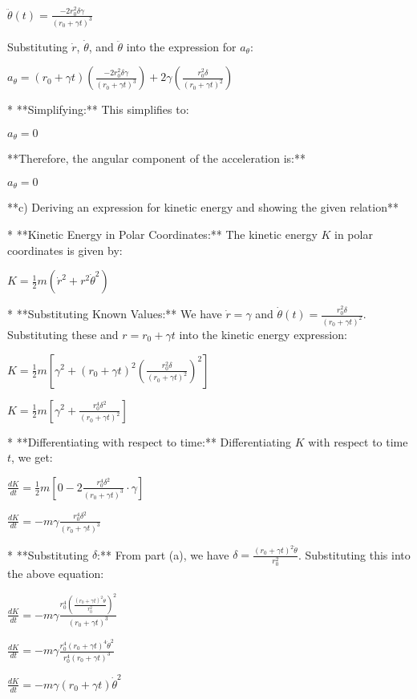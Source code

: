 \documentclass{article}
\begin{document}
   $\ddot{\theta}(t) = \frac{-2r_0^2 \delta \gamma}{(r_0 + \gamma t)^3}$

   Substituting $\dot{r}$, $\dot{\theta}$, and $\ddot{\theta}$ into the expression for $a_\theta$:

   $a_\theta = (r_0 + \gamma t) \left( \frac{-2r_0^2 \delta \gamma}{(r_0 + \gamma t)^3} \right) + 2 \gamma \left( \frac{r_0^2 \delta}{(r_0 + \gamma t)^2} \right)$

* **Simplifying:** This simplifies to:

   $a_\theta = 0$

**Therefore, the angular component of the acceleration is:**

$\boxed{a_\theta = 0}$


**c) Deriving an expression for kinetic energy and showing the given relation**

* **Kinetic Energy in Polar Coordinates:** The kinetic energy $K$ in polar coordinates is given by:

   $K = \frac{1}{2}m (\dot{r}^2 + r^2 \dot{\theta}^2)$

* **Substituting Known Values:** We have $\dot{r} = \gamma$ and $\dot{\theta}(t) = \frac{r_0^2 \delta}{(r_0 + \gamma t)^2}$. Substituting these and $r = r_0 + \gamma t$ into the kinetic energy expression:

   $K = \frac{1}{2}m \left[ \gamma^2 + (r_0 + \gamma t)^2 \left( \frac{r_0^2 \delta}{(r_0 + \gamma t)^2} \right)^2 \right]$

   $K = \frac{1}{2}m \left[ \gamma^2 + \frac{r_0^4 \delta^2}{(r_0 + \gamma t)^2} \right]$

* **Differentiating with respect to time:** Differentiating $K$ with respect to time $t$, we get:

   $\frac{dK}{dt} = \frac{1}{2}m \left[ 0 - 2 \frac{r_0^4 \delta^2}{(r_0 + \gamma t)^3} \cdot \gamma \right]$

   $\frac{dK}{dt} = -m \gamma \frac{r_0^4 \delta^2}{(r_0 + \gamma t)^3}$

* **Substituting $\delta$:** From part (a), we have $\delta = \frac{(r_0 + \gamma t)^2 \dot{\theta}}{r_0^2}$. Substituting this into the above equation:

   $\frac{dK}{dt} = -m \gamma \frac{r_0^4 \left( \frac{(r_0 + \gamma t)^2 \dot{\theta}}{r_0^2} \right)^2}{(r_0 + \gamma t)^3}$

   $\frac{dK}{dt} = -m \gamma \frac{r_0^4 (r_0 + \gamma t)^4 \dot{\theta}^2}{r_0^4 (r_0 + \gamma t)^3}$

   $\frac{dK}{dt} = -m \gamma (r_0 + \gamma t) \dot{\theta}^2$
\end{document}
